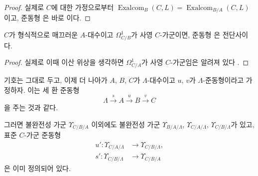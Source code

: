 \begin{proof}
실제로 $C$에 대한 가정으로부터
$\operatorname{Exalcom}_B(C,L)=\operatorname{Exalcom}_{B/A}(C,L)$이고,
준동형 은 바로 이다.
\end{proof}

\begin{corollary}[20.6.13]
\label{0.20.6.13-ko}
$C$가 형식적으로 매끄러운 $A$-대수이고 $\Omega^1_{C/B}$가
사영 $C$-가군이면, 준동형 은 전단사이다.
\end{corollary}

\begin{proof}
실제로 이때 이산 위상을 생각하면 $\Omega^1_{C/A}$가 사영
$C$-가군임은 알려져 있다 .
\end{proof}

\begin{env}[20.6.14]
\label{0.20.6.14-ko}
기호는 그대로 두고, 이제 더 나아가 $A$, $B$, $C$가
$\Lambda$-대수이고 $u$, $v$가 $\Lambda$-준동형이라고 가정하자.
이는 세 환 준동형
\[
  \Lambda\xrightarrow{s}A\xrightarrow{u}B\xrightarrow{v}C
\]
을 주는 것과 같다.

그러면 불완전성 가군 $\Upsilon_{C/B/A}$ 이외에도 불완전성 가군
$\Upsilon_{B/A/\Lambda}$, $\Upsilon_{C/A/\Lambda}$,
$\Upsilon_{C/B/\Lambda}$가 있고, 표준 $C$-가군 준동형
\begin{align}
\tag{20.6.14.1}
\label{0.20.6.14.1-ko}
  u':\Upsilon_{C/A/\Lambda}&\longrightarrow\Upsilon_{C/B/\Lambda},\\
\tag{20.6.14.2}
\label{0.20.6.14.2-ko}
  s':\Upsilon_{C/B/\Lambda}&\longrightarrow\Upsilon_{C/B/A}
\end{align}
은 이미 정의되어 있다.


\end{env}
